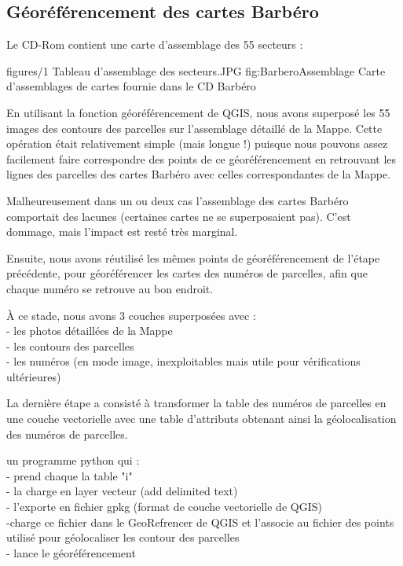 \subsection{Géoréférencement des cartes Barbéro}

Le CD-Rom contient une carte d’assemblage des 55 secteurs :


\cartefigure 
{figures/1 Tableau d'assemblage des secteurs.JPG}
{fig:BarberoAssemblage}
{Carte d'assemblages de cartes fournie dans le CD Barbéro}


En utilisant la fonction géoréférencement de QGIS, nous avons superposé les 55 images des contours des parcelles sur l’assemblage détaillé de la Mappe. Cette opération était relativement simple (mais longue !) puisque nous pouvons assez facilement faire correspondre des points de ce géoréférencement en retrouvant les lignes des parcelles des cartes Barbéro avec celles correspondantes de la Mappe.

Malheureusement dans un ou deux cas l’assemblage des cartes Barbéro comportait des lacunes (certaines cartes ne se superposaient pas). C’est dommage, mais l’impact est resté très marginal.

Ensuite, nous avons réutilisé les mêmes points de géoréférencement de l’étape précédente, pour géoréférencer les cartes des numéros de parcelles, afin que chaque numéro se retrouve au bon endroit.

À ce stade, nous avons 3 couches superposées avec :\\
- les photos détaillées de la Mappe\\
- les contours des parcelles\\
- les numéros (en mode image, inexploitables mais utile pour vérifications ultérieures)


La dernière étape a consisté à transformer la table des numéros de parcelles en une couche vectorielle avec une table d’attributs obtenant ainsi la géolocalisation des numéros de parcelles.

un programme python qui : \\
- prend chaque la table "i"\\
- la charge en layer vecteur (add delimited text)\\
- l'exporte en fichier gpkg (format de couche vectorielle de QGIS)\\
-charge ce fichier dans le GeoRefrencer de QGIS et l'associe au fichier des points utilisé pour géolocaliser les contour des parcelles\\
- lance le géoréférencement

